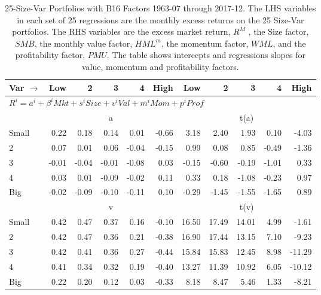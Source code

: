 
\begin{table}[!ht]
\footnotesize
\centering
\caption{
\scriptsize{
25-Size-Var Portfolios with B16 Factors 1963-07 through 2017-12.
The LHS variables in each set of 25 regressions are the monthly excess returns on the 25
Size-Var portfolios. The RHS variables are the excess market return, $R^M$ , the Size
factor, $SMB$, the monthly value factor, $HML^m$, the momentum factor, $WML$, and the
profitability factor, $PMU$. The table shows intercepts and regressions slopes for value,
momentum and profitability factors.
}
}
\begin{tabular}{lrrrrrrrrrr}
  \toprule
    Var $\rightarrow$ & Low & 2 & 3 & 4 & High & Low & 2 & 3 & 4 & High \\ 
  \midrule
  \multicolumn{11}{l}{$R^i=a^i+\beta^iMkt+s^iSize+v^iVal+m^iMom+p^iProf$} \\

  
    
      & \multicolumn{5}{c}{a} & \multicolumn{5}{c}{t(a)}
    
    \\
      \cmidrule(r){2-6} \cmidrule(r){7-11}

    Small   & 0.22  & 0.18  & 0.14  & 0.01  & -0.66  & 3.18  & 2.40  & 1.93  & 0.10  & -4.03  \\
         2  & 0.07  & 0.01  & 0.06  & -0.04  & -0.15  & 0.99  & 0.08  & 0.85  & -0.49  & -1.36  \\
         3  & -0.01  & -0.04  & -0.01  & -0.08  & 0.03  & -0.15  & -0.60  & -0.19  & -1.01  & 0.33  \\
         4  & 0.03  & 0.01  & -0.09  & -0.02  & 0.11  & 0.33  & 0.18  & -1.08  & -0.23  & 0.97  \\
    Big     & -0.02  & -0.09  & -0.10  & -0.11  & 0.10  & -0.29  & -1.45  & -1.55  & -1.65  & 0.89  \\

  
    
      & \multicolumn{5}{c}{v} & \multicolumn{5}{c}{t(v)}
    
    \\
      \cmidrule(r){2-6} \cmidrule(r){7-11}

    Small   & 0.42  & 0.47  & 0.37  & 0.16  & -0.10  & 16.50  & 17.49  & 14.01  & 4.99  & -1.61  \\
         2  & 0.42  & 0.47  & 0.36  & 0.21  & -0.38  & 16.90  & 17.44  & 13.15  & 7.10  & -9.23  \\
         3  & 0.42  & 0.41  & 0.36  & 0.27  & -0.44  & 15.84  & 15.83  & 12.45  & 8.98  & -11.29  \\
         4  & 0.41  & 0.34  & 0.32  & 0.19  & -0.40  & 13.27  & 11.39  & 10.92  & 6.05  & -10.12  \\
    Big     & 0.22  & 0.20  & 0.12  & 0.03  & -0.33  & 8.18  & 8.47  & 5.46  & 1.33  & -8.21  \\


\end{tabular}
\end{table}
